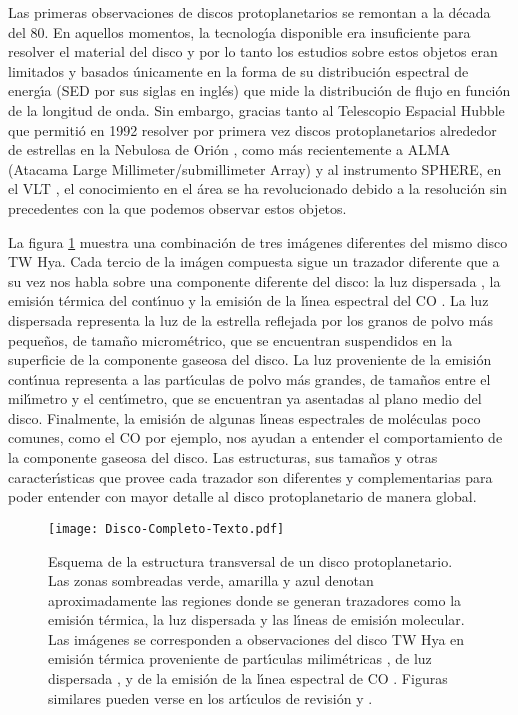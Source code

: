 \documentclass[baaa]{baaa}
\begin{document}
Las primeras observaciones de discos protoplanetarios se remontan a la d\'ecada del 80. En aquellos momentos, la tecnolog\'{\i}a disponible era insuficiente para resolver el material del disco y por lo tanto los estudios sobre estos objetos eran limitados y basados \'unicamente en la forma de su distribuci\'on espectral de energ\'{\i}a (SED por sus siglas en ingl\'es) que mide la distribuci\'on de flujo en funci\'on de la longitud de onda. Sin embargo, gracias tanto al Telescopio Espacial Hubble que permiti\'o en 1992 resolver por primera vez discos protoplanetarios alrededor de estrellas en la Nebulosa de Orión \citep{ODellll1993}, como m\'as recientemente a ALMA (Atacama Large
Millimeter/submillimeter Array) \citep{ALMA2015} y al instrumento SPHERE, en el VLT \citep{Garufi2017}, el conocimiento en el área se ha revolucionado debido a la resoluci\'on sin precedentes con la que podemos observar estos objetos.

La figura \ref{Figura1} muestra una combinaci\'on de tres im\'agenes diferentes del mismo disco TW Hya. Cada tercio de la im\'agen compuesta sigue un trazador diferente que a su vez nos habla sobre una componente diferente del disco: la luz dispersada \citep{vanBoekel2017}, la emisi\'on t\'ermica del cont\'{\i}nuo \citep{Andrews2016} y la emisi\'on de la l\'{\i}nea espectral del CO \citep{Huang2018}. La luz dispersada representa la luz de la estrella reflejada por los granos de polvo m\'as peque\~nos, de tama\~no microm\'etrico, que se encuentran suspendidos en la superficie de la componente gaseosa del disco. La luz proveniente de la emisi\'on cont\'{\i}nua representa a las part\'{\i}culas de polvo m\'as grandes, de tama\~nos entre el mil\'{\i}metro y el cent\'{\i}metro, que se encuentran ya asentadas al plano medio del disco. Finalmente, la emisi\'on de algunas l\'{\i}neas espectrales de mol\'eculas poco comunes, como el CO por ejemplo, nos ayudan a entender el comportamiento de la componente gaseosa del disco. Las estructuras, sus tama\~nos y otras caracter\'{\i}sticas que provee cada trazador son diferentes y complementarias para poder entender con mayor detalle al disco protoplanetario de manera global.

\begin{figure}[!t]
\centering
\texttt{[image: Disco-Completo-Texto.pdf]}
\caption{Esquema de la estructura transversal de un disco protoplanetario. Las zonas sombreadas verde, amarilla y azul denotan aproximadamente las regiones donde se generan trazadores como la emisión térmica, la luz dispersada y las l\'{\i}neas de emisi\'on molecular. Las im\'agenes se corresponden a observaciones del disco TW Hya en emisi\'on térmica proveniente de part\'{\i}culas milim\'etricas \citep{Andrews2016}, de luz dispersada \citep{vanBoekel2017}, y de la emisi\'on de la l\'{\i}nea espectral de CO \citep{Huang2018}. Figuras similares pueden verse en los art\'{\i}culos de revisi\'on \citet{Andrews2020} y \citet{Birnstiel2023}.}
\label{Figura1}
\end{figure}
\end{document}
